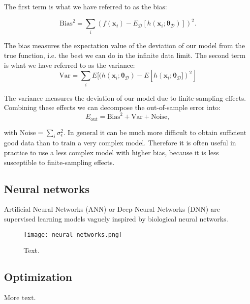 The first term is what we have referred to as the bias:

\begin{equation}
    \text{Bias}^2 = \sum_i (f(\bm{x}_i) - E_{\mathcal{D}}[h(\bm{x}_i ; \bm{\theta}_{\mathcal{D}})])^2.
\end{equation}

The bias measures the expectation value of the deviation of our model from the true
function, i.e. the best we can do in the infinite data limit.
\newline
The second term is what we have referred to as the variance:
\begin{equation}
    \text{Var} = \sum_i  E[(h(\bm{x}_i ; \bm{\theta}_{\mathcal{D}}) - E[h(\bm{x}_i ; \bm{\theta}_{\mathcal{D}}])^2]
\end{equation}

The variance measures the deviation of our model due to finite-sampling effects.
Combining these effects we can decompose the out-of-sample error into:
\begin{equation}
    E_{\text{out}} = \text{Bias}^2 + \text{Var} + \text{Noise},
\end{equation}

with $\text{Noise} = \sum_i \sigma_{\epsilon}^2$.
\newline
In general it can be much more difficult to obtain sufficient good data
than to train a very complex model. Therefore it is often useful in practice
to use a less complex model with higher bias, because it is less susceptible
to finite-sampling effects.

\subsection{Neural networks}
Artificial Neural Networks (ANN) or Deep Neural Networks (DNN) are
supervised learning models vaguely inspired by biological neural networks.

\begin{figure}
    \texttt{[image: neural-networks.png]}
    \caption{Text.}
\end{figure}

\subsection{Optimization}
More text.
